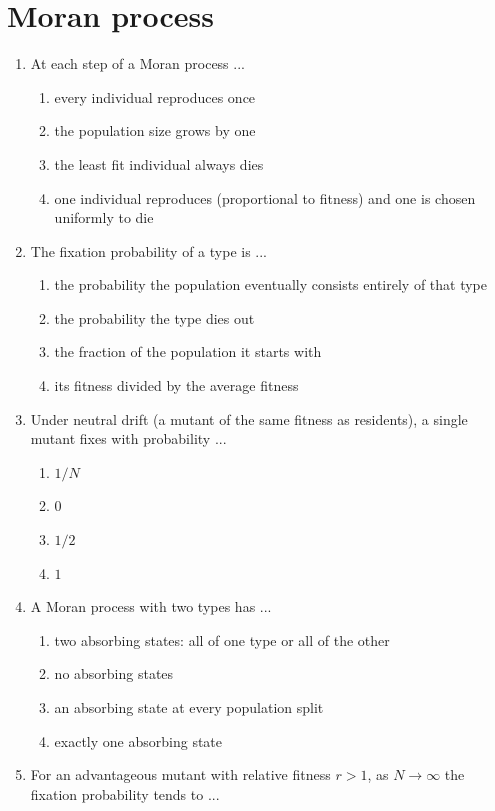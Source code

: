 \documentclass[11pt]{article}
\begin{document}
\section*{Moran process}
\begin{enumerate}[itemsep=6pt]
  \item At each step of a Moran process ...
  \begin{enumerate}
    \item every individual reproduces once
    \item the population size grows by one
    \item the least fit individual always dies
    \item one individual reproduces (proportional to fitness) and one is chosen uniformly to die
  \end{enumerate}
  \item The fixation probability of a type is ...
  \begin{enumerate}
    \item the probability the population eventually consists entirely of that type
    \item the probability the type dies out
    \item the fraction of the population it starts with
    \item its fitness divided by the average fitness
  \end{enumerate}
  \item Under neutral drift (a mutant of the same fitness as residents), a single mutant fixes with probability ...
  \begin{enumerate}
    \item \(1/N\)
    \item \(0\)
    \item \(1/2\)
    \item \(1\)
  \end{enumerate}
  \item A Moran process with two types has ...
  \begin{enumerate}
    \item two absorbing states: all of one type or all of the other
    \item no absorbing states
    \item an absorbing state at every population split
    \item exactly one absorbing state
  \end{enumerate}
  \item For an advantageous mutant with relative fitness \(r > 1\), as \(N \to \infty\) the fixation probability tends to ...

\end{enumerate}
\end{document}
